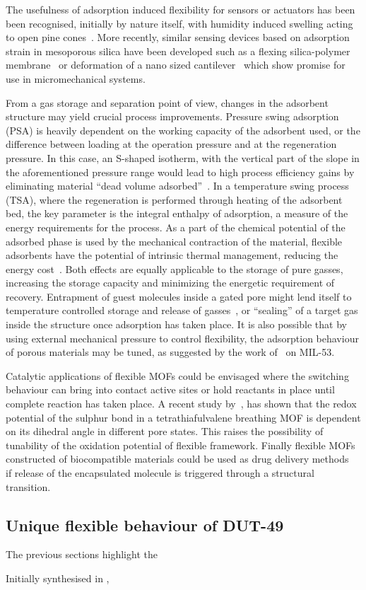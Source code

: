 The usefulness of adsorption induced flexibility for sensors or
actuators has been been recognised, initially by nature itself,
with humidity induced swelling acting to open pine 
cones~\cite{dawsonHowPineCones1997}.
More recently, similar sensing devices based on adsorption strain 
in mesoporous silica have been 
developed such as a flexing silica-polymer 
membrane~\cite{boudotConvertingWaterAdsorption2016} or 
deformation of a nano sized 
cantilever~\cite{ganserCantileverBendingBased2016} 
which show promise for use in micromechanical systems. 

From a gas storage and separation point of view, changes in the
adsorbent structure may yield crucial process improvements. 
Pressure swing adsorption (PSA) is heavily
dependent on the working capacity of the adsorbent used, or the
difference between loading at the operation pressure and at the 
regeneration pressure. In this case, an S-shaped isotherm, with 
the vertical part of the slope in the aforementioned pressure 
range would lead to high process efficiency gains by eliminating material
``dead volume adsorbed''~\cite{schneemannFlexibleMetalOrganic2014}. 
In a temperature swing process (TSA), where 
the regeneration is performed through heating of the adsorbent 
bed, the key parameter is the integral enthalpy of adsorption, a measure 
of the energy requirements for the process. As a part of the chemical 
potential of the adsorbed phase is used by the mechanical contraction
of the material, flexible adsorbents have the potential of
intrinsic thermal management, reducing the energy 
cost~\cite{masonMethaneStorageFlexible2015}.
Both effects are equally applicable to the storage of pure 
gasses, increasing the storage capacity and minimizing the energetic
requirement of recovery. Entrapment of guest molecules inside 
a gated pore might lend itself to temperature controlled storage and 
release of gasses~\cite{bunzenAchievingLargeVolumetric2018}, or
``sealing'' of a target gas inside the structure once adsorption
has taken place.
It is also possible that by using external mechanical pressure to
control flexibility, the adsorption behaviour of porous materials
may be tuned, as suggested by the work 
of~\citet{chanutUsingExternalFactors2016} on MIL-53. 

Catalytic applications of flexible MOFs could be envisaged where 
the switching behaviour can bring into contact active sites or 
hold reactants in place until complete reaction has taken place.
A recent study by~\citet{soutoBreathingDependentRedoxActivity2018},
has shown that the redox potential of the sulphur bond in a 
tetrathiafulvalene breathing MOF is dependent on its dihedral 
angle in different pore states. This raises the possibility of 
tunability of the oxidation potential of flexible framework.
Finally flexible MOFs constructed of biocompatible materials 
could be used as drug delivery 
methods~\cite{mckinlayNitricOxideAdsorption2013, %
horcajadaFlexiblePorousMetalOrganic2008} if release 
of the encapsulated molecule is triggered through a 
structural transition.


\subsection{Unique flexible behaviour of DUT-49}

The previous sections highlight the 

Initially synthesised in \citeyear{stoeckHighlyPorousMetal2012},


